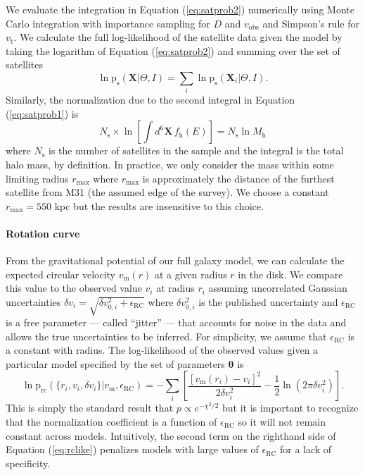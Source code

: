 \documentclass[preprint]{aastex}
\newcommand{\eqlabel}[1]{\label{eq:#1}}
\newcommand{\eq}[1]{Equation (\ref{eq:#1})}
\begin{document}
We evaluate the integration in \eq{satprob2}  numerically using Monte
Carlo integration with importance sampling for $D$ and $v_\mathrm{obs}$ and
Simpson's rule for $v_{\mathrm{t}}$.  We calculate the full log-likelihood of the
satellite data given the model by taking the logarithm of \eq{satprob2}
and summing over the set of satellites
\begin{equation}
    \ln \mathrm{p}_\mathrm{s} (\mathbf{X}| \Theta, I)
    = \sum_i \ln \mathrm{p}_\mathrm{s} (\mathbf{X}_i | \Theta,I).
\end{equation}
Similarly, the normalization due to the second integral in \eq{satprob1} is
\begin{equation}
    \eqlabel{satnorm}
    N_\mathrm{s} \times
        \ln \left [ \int d^6 \mathbf{X} \, f_\mathrm{h} (E) \right ] =
        N_\mathrm{s} \ln M_\mathrm{h}
\end{equation}
where $N_\mathrm{s}$ is the number of satellites in the sample and the integral
is the total halo mass, by definition.  In practice, we only consider the mass
within some limiting radius $r_\mathrm{max}$ where $r_\mathrm{max}$ is approximately
the distance of the furthest satellite from M31 (the assumed edge of the survey).
We choose a constant $r_\mathrm{max} = 550$ kpc but the results are insensitive
to this choice.

\paragraph{Rotation curve}

From the gravitational potential of our full galaxy model, we can calculate the
expected circular velocity $v_\mathrm{m}(r)$ at a given radius $r$ in the disk.
We compare this value to the observed value $v_i$ at radius $r_i$ assuming
uncorrelated Gaussian uncertainties
$\delta v_i = \sqrt{\delta v_{0,i}^2 + \epsilon_\mathrm{RC}}$ where
$\delta v_{0,i}^2$ is the published uncertainty and $\epsilon_\mathrm{RC}$ is a
free parameter --- called ``jitter'' --- that accounts for noise in the data and
allows the true uncertainties to be inferred.  For simplicity, we assume that
$\epsilon_\mathrm{RC}$ is a constant with radius.  The log-likelihood of the
observed values given a particular model specified by the set of parameters
$\mathbf{\theta}$ is
\begin{equation}
    \eqlabel{rclike}
    \ln \mathrm{p}_\mathrm{rc} (\{ r_i, v_i, \delta v_i \}| v_\mathrm{m},
    \epsilon_\mathrm{RC}) = - \sum_i \left [ \frac{[v_\mathrm{m}(r_i) - v_i]^2}
        {2 \delta v_i ^2} - \frac{1}{2} \ln (2 \pi \delta v_i ^2) \right ].
\end{equation}
This is simply the standard result that $p \propto e^{-\chi^2/2}$ but it is
important to recognize that the normalization coefficient is a function of
$\epsilon_\mathrm{RC}$ so it will not remain constant across models.
Intuitively, the second term on the righthand side of \eq{rclike} penalizes
models with large values of $\epsilon_\mathrm{RC}$ for a lack of specificity.
\end{document}
